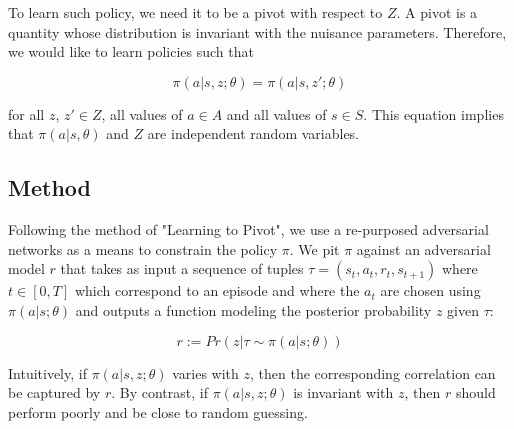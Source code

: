 \documentclass[]{article}
\begin{document}
To learn such policy, we need it to be a pivot with respect to $Z$. A pivot is  a quantity whose distribution is invariant with the nuisance parameters. Therefore, we would like to learn policies such that

\begin{equation}
\pi (a | s, z; \theta) = \pi (a | s, z'; \theta)
\end{equation}

for all $z$, $z' \in Z$, all values of $a \in A$ and all values of $s \in S$. This equation implies that $\pi(a | s, \theta)$ and $Z$ are independent random variables.

\subsection{Method}
Following the method of "Learning to Pivot", we use a re-purposed adversarial networks as a means to constrain the policy $\pi$. We pit $\pi$ against an adversarial model $r$ that takes as input a sequence of tuples $\tau = (s_t, a_t, r_t, s_{t+1})$ where $t \in [0, T]$ which correspond to an episode and where the $a_t$ are chosen using $\pi(a | s;\theta)$ and  outputs a function modeling the posterior probability $z$ given $\tau$:

\begin{equation}
r := Pr(z | \tau \sim \pi(a | s;\theta))
\end{equation}


Intuitively, if $\pi (a | s, z; \theta)$ varies with $z$, then the corresponding correlation can be captured by $r$. By contrast, if $\pi (a | s, z; \theta)$ is invariant with $z$, then $r$ should perform poorly and be close to random guessing.


 
\end{document}
